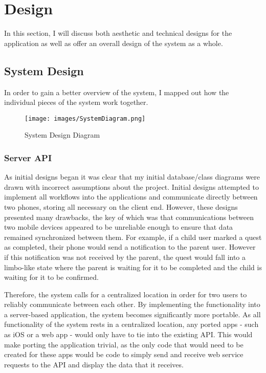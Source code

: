 \chapter{Design}
In this section, I will discuss both aesthetic and technical designs for the application as well as offer an overall design of the system as a whole.

\section{System Design}
In order to gain a better overview of the system, I mapped out how the individual pieces of the system work together.

\begin{figure}[ht]
	\centering
	\texttt{[image: images/SystemDiagram.png]}
	\caption{System Design Diagram}
	\label{fig:systemdesign}
\end{figure} 

\subsection{Server API}
As initial designs began it was clear that my initial database/class diagrams were drawn with incorrect assumptions about the project. 
Initial designs attempted to implement all workflows into the applications and communicate directly between two phones, storing all necessary on the client end. 
However, these designs presented many drawbacks, the key of which was that communications between two mobile devices appeared to be unreliable enough to ensure that data remained synchronized between them.
For example, if a child user marked a quest as completed, their phone would send a notification to the parent user.
However if this notification was not received by the parent, the quest would fall into a limbo-like state where the parent is waiting for it to be completed and the child is waiting for it to be confirmed.

Therefore, the system calls for a centralized location in order for two users to reliably communicate between each other.
By implementing the functionality into a server-based application, the system becomes significantly more portable. 
As all functionality of the system rests in a centralized location, any ported apps - such as iOS or a web app - would only have to tie into the existing API.
This would make porting the application trivial, as the only code that would need to be created for these apps would be code to simply send and receive web service requests to the API and display the data that it receives.

